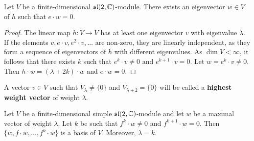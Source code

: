 
\begin{lemma}
\label{lem:maximal_weight}
    Let $V$ be a finite-dimensional $\mathfrak{sl}(2,\mathbb{C})$-module.
    There exists an eigenvector 
    $w\in V$ of $h$ such that $e\cdot w=0$. 
\end{lemma}

\begin{proof}
    The linear map $h\colon V\to V$ has at least one eigenvector 
    $v$ with eigenvalue $\lambda$. If the elements 
    $v,e\cdot v,e^2\cdot v,\dots$ are non-zero, they are linearly independent, as they 
    form a sequence of eigenvectors of $h$ with different eigenvalues.  
    As $\dim V<\infty$, it follows that there exists $k$ 
    such that $e^k\cdot v\ne 0$ and $e^{k+1}\cdot v=0$. 
    Let $w=e^k\cdot v\ne 0$. 
    Then
    $h\cdot w=(\lambda+2k)\cdot w$ and $e\cdot w=0$. 
\end{proof}

A vector $v\in V$ such that $V_{\lambda}\ne\{0\}$ and
$V_{\lambda+2}=\{0\}$ will be called a \textbf{highest weight vector} 
of weight $\lambda$. 

\begin{lemma}
\label{lem:basis}
    Let $V$ be a finite-dimensional simple $\mathfrak{sl}(2,\mathbb{C})$-module
    and let $w$ be a maximal vector of weight $\lambda$. Let 
    $k$ be such that $f^k\cdot w\ne 0$ and $f^{k+1}\cdot w=0$.
    Then $\{w,f\cdot w,\dots,f^{k}\cdot w\}$ is a basis of $V$.
    Moreover, $\lambda=k$.
\end{lemma}

